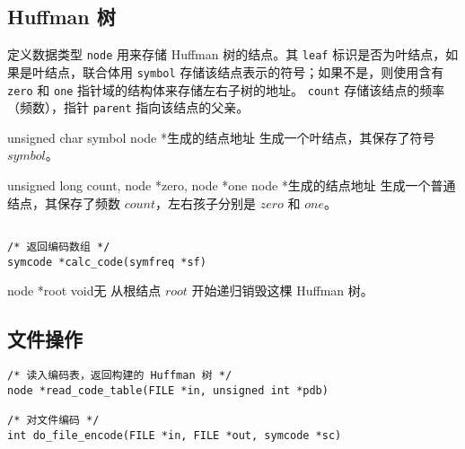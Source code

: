 \subsection{Huffman 树}

\begin{center}
\end{center}

定义数据类型 \verb|node| 用来存储 Huffman 树的结点。其 \verb|leaf| 标识是否为叶结点，如果是叶结点，联合体用 \verb|symbol| 存储该结点表示的符号；如果不是，则使用含有 \verb|zero| 和 \verb|one| 指针域的结构体来存储左右子树的地址。
 \verb|count| 存储该结点的频率（频数），指针 \verb|parent| 指向该结点的父亲。

{unsigned char symbol}
{node *}{生成的结点地址}
{生成一个叶结点，其保存了符号 $symbol$。}

{unsigned long count, node *zero, node *one}
{node *}{生成的结点地址}
{生成一个普通结点，其保存了频数 $count$，左右孩子分别是 $zero$ 和 $one$。}

\begin{verbatim}

/* 返回编码数组 */
symcode *calc_code(symfreq *sf)

\end{verbatim}

{node *root}
{void}{无}
{从根结点 $root$ 开始递归销毁这棵 Huffman 树。}

\subsection{文件操作}

\begin{verbatim}
/* 读入编码表，返回构建的 Huffman 树 */
node *read_code_table(FILE *in, unsigned int *pdb)

/* 对文件编码 */
int do_file_encode(FILE *in, FILE *out, symcode *sc)

\end{verbatim}
